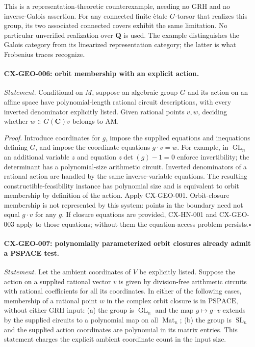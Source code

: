 This is a representation-theoretic counterexample, needing no GRH and no
inverse-Galois assertion. For any connected finite \`etale $G$-torsor that
realizes this group, its two associated connected covers exhibit the same
limitation. No particular unverified realization over $\mathbf Q$ is used.
The example distinguishes the Galois category from its linearized
representation category; the latter is what Frobenius traces recognize.

\paragraph{CX-GEO-006: orbit membership with an explicit action.}
\emph{Statement.} Conditional on $M$, suppose an algebraic group $G$ and its
action on an affine space have polynomial-length rational circuit descriptions,
with every inverted denominator explicitly listed. Given rational points
$v,w$, deciding whether $w\in G(\mathbf C)v$ belongs to $\mathrm{AM}$.

\emph{Proof.} Introduce coordinates for $g$, impose the supplied equations
and inequations defining $G$, and impose the coordinate equations
$g\cdot v=w$. For example, in $\operatorname{GL}_n$ an additional variable
$z$ and equation $z\det(g)-1=0$ enforce invertibility; the determinant has
a polynomial-size arithmetic circuit. Inverted denominators of a rational
action are handled by the same inverse-variable equations. The resulting
constructible-feasibility instance has polynomial size and is equivalent to
orbit membership by definition of the action. Apply CX-GEO-001.
Orbit-closure membership is not represented by this system: points in the
boundary need not equal $g\cdot v$ for any $g$. If closure equations are
provided, CX-HN-001 and CX-GEO-003 apply to those equations; without them
the equation-access problem persists.\hfill$\square$

\paragraph{CX-GEO-007: polynomially parameterized orbit closures already admit a PSPACE test.}
\emph{Statement.} Let the ambient coordinates of $V$ be explicitly listed.
Suppose the action on a supplied rational vector $v$ is given by
division-free arithmetic circuits with rational coefficients for all its
coordinates. In either of the following
cases, membership of a rational point $w$ in the complex orbit closure is
in $\mathrm{PSPACE}$, without either GRH input: (a) the group is
$\operatorname{GL}_n$ and the map $g\mapsto g\cdot v$ extends by the supplied
circuits to a polynomial map on all $\operatorname{Mat}_n$; (b) the group is
$\operatorname{SL}_n$ and the supplied action coordinates are polynomial
in its matrix entries. This statement charges the explicit ambient
coordinate count in the input size.

